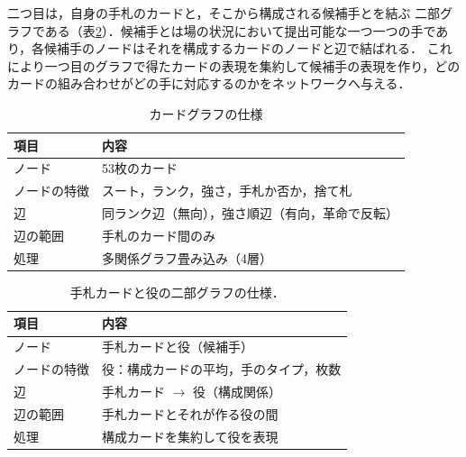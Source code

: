 \documentclass[a4j,dvipdfmx]{jarticle}
\begin{document}
\begin{Abstract}
二つ目は，自身の手札のカードと，そこから構成される候補手とを結ぶ
二部グラフである（表\ref{tab:graph_bipartite}）．候補手とは場の状況において提出可能な一つ一つの手であり，各候補手のノードはそれを構成するカードのノードと辺で結ばれる．
これにより一つ目のグラフで得たカードの表現を集約して候補手の表現を作り，どのカードの組み合わせがどの手に対応するのかをネットワークへ与える．

\begin{table}[t]
  \centering
  \caption{カードグラフの仕様}
  \label{tab:graph_card}
  \small
  \begin{tabularx}{0.85\linewidth}{l >{\raggedright\arraybackslash}X}
    \toprule
    項目 & 内容 \\
    \midrule
    ノード       & 53枚のカード \\
    ノードの特徴 & スート，ランク，強さ，手札か否か，捨て札 \\
    辺           & 同ランク辺（無向），強さ順辺（有向，革命で反転） \\
    辺の範囲     & 手札のカード間のみ \\
    処理         & 多関係グラフ畳み込み（4層） \\
    \bottomrule
  \end{tabularx}
\end{table}

\begin{table}[t]
  \centering
  \caption{手札カードと役の二部グラフの仕様．}
  \label{tab:graph_bipartite}
  \small
  \begin{tabularx}{0.85\linewidth}{l >{\raggedright\arraybackslash}X}
    \toprule
    項目 & 内容 \\
    \midrule
    ノード       & 手札カードと役（候補手） \\
    ノードの特徴 & 役：構成カードの平均，手のタイプ，枚数 \\
    辺           & 手札カード $\rightarrow$ 役（構成関係） \\
    辺の範囲     & 手札カードとそれが作る役の間 \\
    処理         & 構成カードを集約して役を表現 \\
    \bottomrule
  \end{tabularx}
\end{table}

\begin{figure}[t!]
  \centering
  \begin{minipage}{0.48\linewidth}
    \centering
\end{minipage}
\end{figure}
\end{Abstract}
\end{document}

